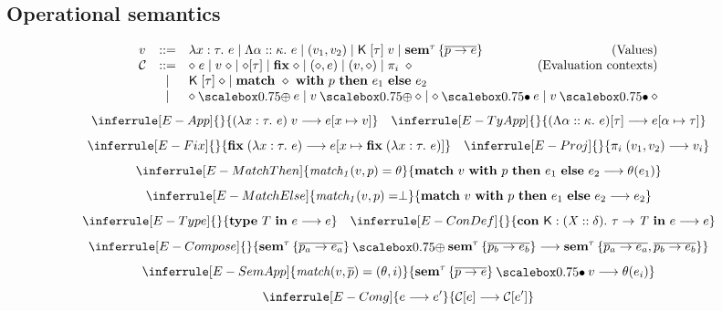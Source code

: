 \documentclass{article}
\begin{document}
\subsection*{Operational semantics}
\[
  \begin{array}{lcl}
    v &::=& \tmlam{x}{\tau}{e} \mid \tmtylam{\alpha}{\kappa}{e} \mid \tmprod{v_1}{v_2} \mid \tmconapp{K}{\tau}{v} \mid \tmsem{\tau}{\overline{p \to e}}\qquad\hfill\text{(Values)}\\
    \mathcal{C} &::=& \tmapp{\diamond}{e} \mid \tmapp{v}{\diamond} \mid \tmtyapp{\diamond}{\tau} \mid \tmfix{\diamond} \mid \tmprod{\diamond}{e} \mid \tmprod{v}{\diamond} \mid \tmproj{i}{\diamond} \qquad\hfill\text{(Evaluation contexts)}\\
      &\mid& \tmconapp{K}{\tau}{\diamond} \mid \tmmatch{\diamond}{p}{e_1}{e_2} \\
      &\mid& \tmcomp{\diamond}{e} \mid \tmcomp{v}{\diamond} \mid \tmsemapp{\diamond}{e} \mid \tmsemapp{v}{\diamond}
  \end{array}
\]
\[
  \inferrule[E-App]
  { }
  {\tmapp{(\tmlam{x}{\tau}{e})}{v} \longrightarrow e[x \mapsto v]}
  \quad
  \inferrule[E-TyApp]
  { }
  {\tmtyapp{(\tmtylam{\alpha}{\kappa}{e})}{\tau} \longrightarrow e[\alpha \mapsto \tau]}
\]
\[
  \inferrule[E-Fix]
  { }
  {\tmfix{(\tmlam{x}{\tau}{e})} \longrightarrow e[x \mapsto \tmfix{(\tmlam{x}{\tau}{e})}]}
  \quad
  \inferrule[E-Proj]
  { }
  {\tmproj{i}{\tmprod{v_1}{v_2}} \longrightarrow v_i}
\]
\[
  \inferrule[E-MatchThen]
  { \mathit{match_1}(v, p) = \theta }
  {\tmmatch{v}{p}{e_1}{e_2} \longrightarrow \theta(e_1)}
\]
\[
  \inferrule[E-MatchElse]
  { \mathit{match_1}(v, p) = \perp }
  {\tmmatch{v}{p}{e_1}{e_2} \longrightarrow e_2}
\]
\[
  \inferrule[E-Type]
  { }
  {\tmtype{T}{e} \longrightarrow e}
  \quad
  \inferrule[E-ConDef]
  { }
  {\tmcondef{K}{X}{\delta}{\tau}{T}{e} \longrightarrow e}
\]
\[
  \inferrule[E-Compose]
  { }
  {\tmcomp{\tmsem{\tau}{\overline{p_a \to e_a}}}{\tmsem{\tau}{\overline{p_b\to e_b}}} \longrightarrow \tmsem{\tau}{\overline{p_a \to e_a},\overline{p_b \to e_b}}}
\]
\[
  \inferrule[E-SemApp]
  {\mathit{match}(v, \overline{p}) = (\theta, i)}
  {\tmsemapp{\tmsem{\tau}{\overline{p \to e}}}{v} \longrightarrow \theta(e_i)}
\]
\[
  \inferrule[E-Cong]
  { e \longrightarrow e' }
  {\mathcal{C}[e] \longrightarrow \mathcal{C}[e']}
\]
\end{document}
